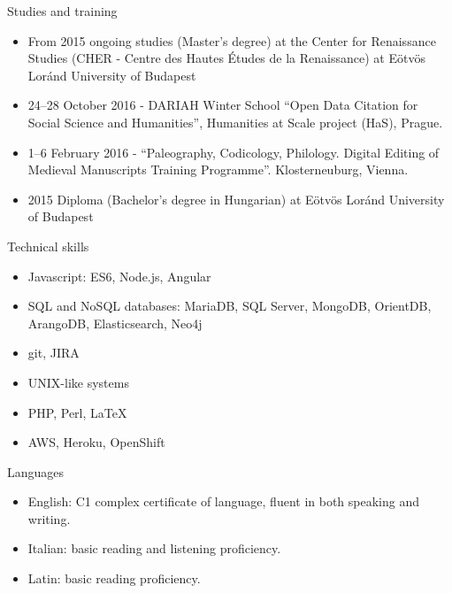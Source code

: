 Studies and training

\begin{itemize}
  \item{From 2015 ongoing studies (Master's degree) at the Center for Renaissance Studies 
    (CHER - Centre des Hautes Études de la Renaissance) at Eötvös Loránd University of Budapest}
  \item{24–28 October 2016 - DARIAH Winter School ``Open Data Citation for Social Science and Humanities'', 
    Humanities at Scale project (HaS), Prague. }
  \item{1--6 February 2016 - ``Paleography, Codicology, Philology.
    Digital Editing of Medieval Manuscripts Training Programme''.
    Klosterneuburg, Vienna. }
  \item{2015 Diploma (Bachelor's degree in Hungarian) at Eötvös Loránd University of Budapest}
\end{itemize}


Technical skills

  \begin{itemize}
    \item{Javascript: ES6, Node.js, Angular}
    \item{SQL and NoSQL databases: MariaDB, SQL Server, 
      MongoDB, OrientDB, ArangoDB, Elasticsearch, Neo4j}
    \item{git, JIRA}
    \item{UNIX-like systems}
    \item{PHP, Perl, \LaTeX}
    \thispagestyle{fancy}
    \item{AWS, Heroku, OpenShift}
  \end{itemize}

Languages
  
  \begin{itemize}
    \item{English: C1 complex certificate of language, fluent in both speaking and writing.}
    \item{Italian: basic reading and listening proficiency.}
    \item{Latin: basic reading proficiency.}
  \end{itemize}

\thispagestyle{fancy}

